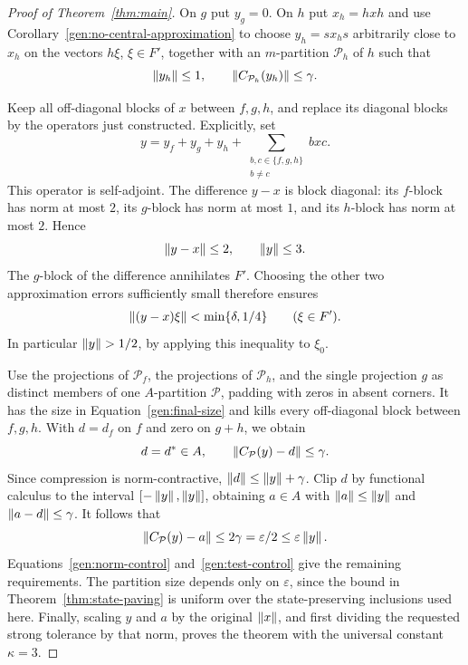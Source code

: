 \begin{proof}[Proof of Theorem~\ref{thm:main}]
On $g$ put $y_g=0$. On $h$ put $x_h=hxh$ and use
Corollary~\ref{gen:no-central-approximation} to choose
$y_h=sx_hs$ arbitrarily close to $x_h$ on the vectors $h\xi$,
$\xi\in F'$, together with an $m$-partition $\mathcal P_h$ of $h$
such that
\[
 \left\lVert y_h\right\rVert\leq1,\qquad\left\lVert C_{\mathcal P_h}(y_h)\right\rVert\leq\gamma.
\]

Keep all off-diagonal blocks of $x$ between $f,g,h$, and replace its
diagonal blocks by the operators just constructed. Explicitly, set
\[
 y=y_f+y_g+y_h+
       \sum_{\substack{b,c\in\{f,g,h\}\\b\ne c}}bxc.
\]
This operator is self-adjoint. The difference $y-x$ is block diagonal:
its $f$-block has norm at most $2$, its $g$-block has norm at most $1$,
and its $h$-block has norm at most $2$. Hence
\begin{equation}\label{gen:norm-control}
 \left\lVert y-x\right\rVert\leq2,\qquad\left\lVert y\right\rVert\leq3.
\end{equation}
The $g$-block of the difference annihilates $F'$. Choosing the other
two approximation errors sufficiently small therefore ensures
\begin{equation}\label{gen:test-control}
 \left\lVert(y-x)\xi\right\rVert<\min\{\delta,1/4\}\qquad(\xi\in F').
\end{equation}
In particular $\left\lVert y\right\rVert>1/2$, by applying this inequality to
$\xi_0$.

Use the projections of $\mathcal P_f$, the projections of
$\mathcal P_h$, and the single projection $g$ as distinct members
of one $A$-partition $\mathcal P$, padding with zeros in absent
corners. It has the size in Equation~\eqref{gen:final-size} and kills
every off-diagonal block between $f,g,h$. With $d=d_f$ on $f$ and
zero on $g+h$, we obtain
\[
 d=d^*\in A,\qquad\left\lVert C_{\mathcal P}(y)-d\right\rVert\leq\gamma.
\]
Since compression is norm-contractive, $\left\lVert d\right\rVert\leq\left\lVert y\right\rVert+\gamma$.
Clip $d$ by functional calculus to the interval
$[-\left\lVert y\right\rVert,\left\lVert y\right\rVert]$, obtaining $a\in A$ with
$\left\lVert a\right\rVert\leq\left\lVert y\right\rVert$ and $\left\lVert a-d\right\rVert\leq\gamma$. It follows that
\[
 \left\lVert C_{\mathcal P}(y)-a\right\rVert
 \leq2\gamma=\varepsilon/2\leq\varepsilon\left\lVert y\right\rVert.
\]
Equations~\eqref{gen:norm-control} and~\eqref{gen:test-control}
give the remaining requirements. The partition size depends only on
$\varepsilon$, since the bound in Theorem~\ref{thm:state-paving} is
uniform over the state-preserving inclusions used here. Finally,
scaling $y$ and $a$ by the original $\left\lVert x\right\rVert$, and first dividing
the requested strong tolerance by that norm, proves the theorem with
the universal constant $\kappa=3$.
\end{proof}

